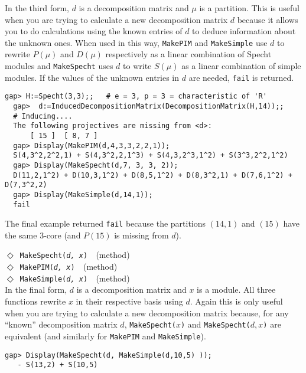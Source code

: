 \documentclass[a4paper,11pt]{report}
\begin{document}
{{{ In the third form, $d$ is a decomposition matrix and $\mu$ is a partition. This is useful when you are trying to calculate a new
decomposition matrix $d$ because it allows you to do calculations using the known entries of $d$ to deduce information about the unknown ones. When used in this way, \texttt{MakePIM} and \texttt{MakeSimple} use $d$ to rewrite $P(\mu)$ and $D(\mu)$ respectively as a linear combination of Specht modules and \texttt{MakeSpecht} uses $d$ to write $S(\mu)$ as a linear combination of simple modules. If the values of the unknown
entries in $d$ are needed, \texttt{fail} is returned. 
\begin{Verbatim}[fontsize=\small,frame=single,label=Example]
  gap> H:=Specht(3,3);;   # e = 3, p = 3 = characteristic of 'R'
  gap>  d:=InducedDecompositionMatrix(DecompositionMatrix(H,14));;
  # Inducing....
  The following projectives are missing from <d>:
      [ 15 ]  [ 8, 7 ]
  gap> Display(MakePIM(d,4,3,3,2,2,1));
  S(4,3^2,2^2,1) + S(4,3^2,2,1^3) + S(4,3,2^3,1^2) + S(3^3,2^2,1^2)
  gap> Display(MakeSpecht(d,7, 3, 3, 2));
  D(11,2,1^2) + D(10,3,1^2) + D(8,5,1^2) + D(8,3^2,1) + D(7,6,1^2) + D(7,3^2,2)
  gap> Display(MakeSimple(d,14,1));
  fail
\end{Verbatim}
 The final example returned \texttt{fail} because the partitions $(14,1)$ and $(15)$ have the same $3$-core (and $P(15)$ is missing from $d$).

 \noindent\textcolor{FuncColor}{$\Diamond$\ \texttt{MakeSpecht({\slshape d, x})
\label{MakeSpecht:for a decomposition matrix and a module}
}\hfill{\scriptsize (method)}}\\
\noindent\textcolor{FuncColor}{$\Diamond$\ \texttt{MakePIM({\slshape d, x})
\label{MakePIM:for a decomposition matrix and a module}
}\hfill{\scriptsize (method)}}\\
\noindent\textcolor{FuncColor}{$\Diamond$\ \texttt{MakeSimple({\slshape d, x})
\label{MakeSimple:for a decomposition matrix and a module}
}\hfill{\scriptsize (method)}}\\


 In the final form, $d$ is a decomposition matrix and $x$ is a module. All three functions rewrite $x$ in their respective basis using $d$. Again this is only useful when you are trying to calculate a new
decomposition matrix because, for any ``known'' decomposition matrix $d$, \texttt{MakeSpecht(}$x$\texttt{)} and \texttt{MakeSpecht(}$d, x$\texttt{)} are equivalent (and similarly for \texttt{MakePIM} and \texttt{MakeSimple}). 
\begin{Verbatim}[fontsize=\small,frame=single,label=Example]
  gap> Display(MakeSpecht(d, MakeSimple(d,10,5) ));
   - S(13,2) + S(10,5)
\end{Verbatim}
 }

}}
\end{document}

